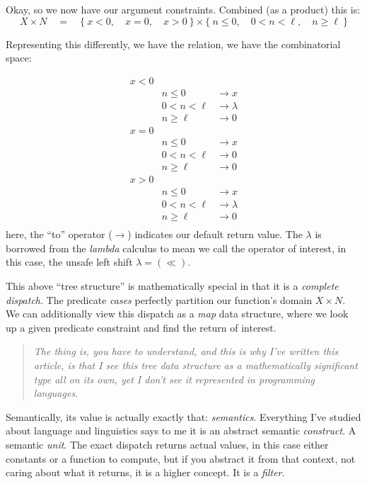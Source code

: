 \documentclass[twoside]{article}
\begin{document}
Okay, so we now have our argument constraints. Combined (as a product) this is:
$$ X\times N\quad =\quad
\{\ x < 0,\quad x = 0,\quad x > 0 \ \} \times \{\ n \le 0,\quad 0 < n < \ell,\quad n \ge \ell \ \} $$

Representing this differently, we have the relation, we have the combinatorial space:

$$ \begin{array}{r|lr}
x < 0	& \\
	& n \le 0	& \to x		\\
	& 0 < n < \ell	& \to \lambda	\\
	& n \ge \ell	& \to 0		\\
x = 0	& \\
	& n \le 0	& \to x		\\
	& 0 < n < \ell	& \to 0		\\
	& n \ge \ell	& \to 0		\\
x > 0	& \\
	& n \le 0	& \to x		\\
	& 0 < n < \ell	& \to \lambda	\\
	& n \ge \ell	& \to 0		\\
\end{array} $$
here, the ``to'' operator ($ \to $) indicates our default return value. The $ \lambda $ is borrowed from
the \emph{lambda} calculus to mean we call the operator of interest, in this case, the unsafe left shift
$ \lambda=(\ll) $.

This above ``tree structure'' is mathematically special in that it is a \emph{complete dispatch}.
The predicate \emph{cases} perfectly partition our function's domain $ X\times N $. We can additionally
view this dispatch as a \emph{map} data structure, where we look up a given predicate constraint and find
the return of interest.

\begin{quote}
\em
The thing is, you have to understand, and this is why I've written this article,
is that I see this tree data structure as a mathematically significant \emph{type}
all on its own, yet I don't see it represented in programming languages.
\end{quote}

Semantically, its value is actually exactly that: \emph{semantics}. Everything I've studied about language
and linguistics says to me it is an abstract semantic \emph{construct}. A semantic \emph{unit}.
The exact dispatch returns actual values, in this case either constants or a function to compute,
but if you abstract it from that context, not caring about what it returns, it is a higher concept.
It is a \emph{filter}.
\end{document}
